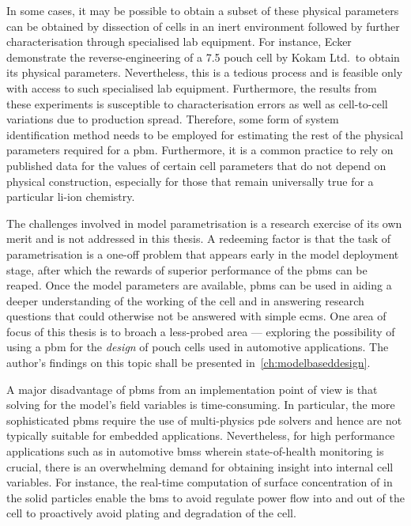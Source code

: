 In  some  cases, it  may  be  possible to  obtain  a  subset of  these  physical
parameters  can be  obtained  by dissection  of cells  in  an inert  environment
followed  by further  characterisation  through specialised  lab equipment.  For
instance, Ecker~\etal~\cite{Ecker2015} demonstrate  the reverse-engineering of a
\SI{7.5}{\amphour} pouch cell by Kokam  Ltd.\ to obtain its physical parameters.
Nevertheless, this is a tedious process and is feasible only with access to such
specialised lab  equipment. Furthermore, the  results from these  experiments is
susceptible to characterisation errors as well as cell-to-cell variations due to
production spread. Therefore, some form of system identification method needs to
be employed  for estimating the rest  of the physical parameters  required for a
\gls{pbm}.  Furthermore, it  is  a common  practice to  rely  on published  data
for  the values  of  certain cell  parameters  that do  not  depend on  physical
construction, especially for those that remain universally true for a particular
li-ion chemistry.

The challenges involved  in model parametrisation is a research  exercise of its
own merit and  is not addressed in  this thesis. A redeeming factor  is that the
task of  parametrisation is a  one-off problem that  appears early in  the model
deployment  stage,  after which  the  rewards  of  superior performance  of  the
\glspl{pbm} can be reaped. Once  the model parameters are available, \glspl{pbm}
can be used in  aiding a deeper understanding of the working of  the cell and in
answering research  questions that could  otherwise not be answered  with simple
\glspl{ecm}. One area  of focus of this  thesis is to broach  a less-probed area
--- exploring  the possibility  of using  a \gls{pbm}  for the  \emph{design} of
pouch cells used in automotive applications. The author's findings on this topic
shall be presented in~\cref{ch:modelbaseddesign}.

A major disadvantage of \glspl{pbm} from an implementation point of view is that
solving for  the model's field  variables is time-consuming. In  particular, the
more  sophisticated  \glspl{pbm}  require  the use  of  multi-physics  \gls{pde}
solvers  and  hence  are  not  typically  suitable  for  embedded  applications.
Nevertheless,  for   high  performance   applications  such  as   in  automotive
\glspl{bms}  wherein   state-of-health  monitoring  is  crucial,   there  is  an
overwhelming  demand for  obtaining insight  into internal  cell variables.  For
instance, the real-time computation of surface concentration of  in the
solid particles enable  the \gls{bms} to avoid regulate power  flow into and out
of the cell to proactively avoid plating and degradation of the cell.

